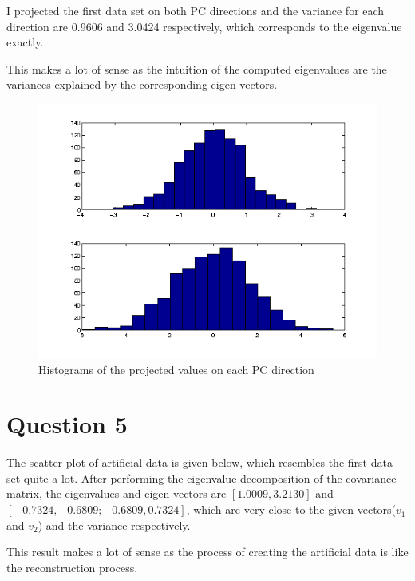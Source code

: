 \documentclass[paper=a4, fontsize=11pt]{scrartcl} %
\numberwithin{equation}{section} %
\numberwithin{figure}{section} %
\numberwithin{table}{section} %
\begin{document}
I projected the first data set on both PC directions and the variance for each direction are 0.9606 and 3.0424 respectively, which corresponds to the eigenvalue exactly.

This makes a lot of sense as the intuition of the computed eigenvalues are the variances explained by the corresponding eigen vectors. 

\begin{figure}[H]
  \centering
  \includegraphics[scale=.7]{histogram}
  \caption{Histograms of the projected values on each PC direction}
\end{figure}


\section {Question 5}

The scatter plot of artificial data is given below, which resembles the first data set quite a lot. After performing the eigenvalue decomposition of the covariance matrix, the eigenvalues and eigen vectors are $[1.0009, 3.2130]$ and  $[-0.7324, -0.6809; -0.6809, 0.7324]$, which are very close to the given vectors($v_1$ and $v_2$) and the variance respectively.

This result makes a lot of sense as the process of creating the artificial data is like the reconstruction process.
\end{document}
